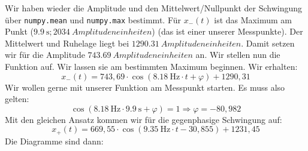 \documentclass{article}
\begin{document}
                  Wir haben wieder die Amplitude und den Mittelwert/Nullpunkt der Schwingung über \texttt{numpy.mean} und \texttt{numpy.max} bestimmt.
                  Für \(x_{-}(t)\) ist das Maximum am Punkt (\(\SI{9.9}{\second}; \SI{2034}{Amplitudeneinheiten}\)) (das ist einer unserer Messpunkte).
                  Der Mittelwert und Ruhelage liegt bei \( \SI{ 1290.31 }{Amplitudeneinheiten} \).
                  Damit setzen wir für die Amplitude \(\SI{743.69}{Amplitudeneinheiten}\) an.
                  Wir stellen nun die Funktion auf. Wir lassen sie am bestimmten Maximum beginnen.
                  Wir erhalten:
                  \begin{equation}
                      x_{-}(t) = 743,69 \cdot \cos( \SI{8.18}{\hertz} \cdot t + \varphi ) + 1290,31
                  \end{equation}
                  Wir wollen gerne mit unserer Funktion am Messpunkt starten. Es muss also gelten:
                  \begin{equation}
                      \cos ( \SI{8.18}{\hertz} \cdot \SI{9.9}{\second} + \varphi ) = 1 \Rightarrow \varphi = -80,982
                  \end{equation}
                  Mit den gleichen Ansatz kommen wir für die gegenphasige Schwingung auf:
                  \begin{equation}
                      x_{+}(t) = 669,55 \cdot \cos( \SI{9.35}{\hertz} \cdot t - 30,855 ) + 1231,45
                  \end{equation}
                  Die Diagramme sind dann:\\
                  \\
\end{document}
